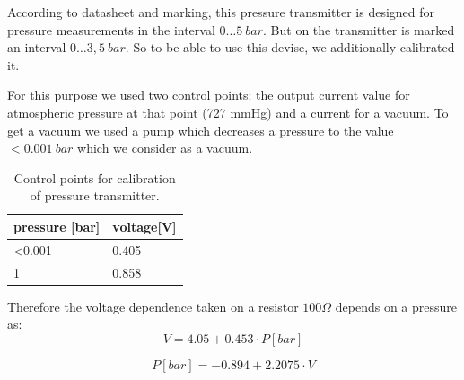 \documentclass[12pt,a4paper]{article}
\begin{document}
	According to datasheet and marking, this pressure transmitter is designed for pressure measurements in the interval $0 \dots 5~bar$. But on the transmitter is marked an interval $0\dots 3,5~bar$. So to be able to use this devise, we additionally calibrated it.
	
	For this purpose we used two control points: the output current value for atmospheric pressure at that point (727 mmHg) and a current for a vacuum. To get a vacuum we used a pump which decreases a pressure to the value  $<0.001~bar$ which we consider as a vacuum.
	

	
	
	\begin{table}[!h]
	\centering
	\caption{ Control points for calibration of pressure transmitter.}
	\begin{tabular}{|l|l|}
		\hline
		pressure [bar] & voltage[V] \\
		\hline
		<0.001 & 0.405\\
		\hline
		1 & 0.858\\
		\hline
	\end{tabular}
	\end{table}
	
	Therefore the voltage dependence taken on a resistor 	$100\Omega$ depends on a pressure as:
	\begin{equation}
	V = 4.05 + 0.453 \cdot P[bar]
	\end{equation}

	\begin{equation}	
	P[bar] = -0.894 + 2.2075 \cdot V
	\end{equation}
\end{document}
